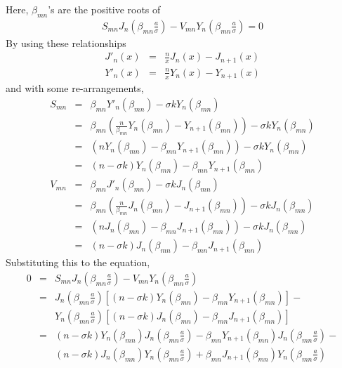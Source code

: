 \documentclass{article}
\begin{document}
Here, $\beta_{mn}$'s are the positive roots of
\begin{eqnarray}
    S_{mn} J_n\left(\beta_{mn}\frac{a}{\sigma}\right) -
    V_{mn} Y_n\left(\beta_{mn}\frac{a}{\sigma}\right) = 0
\end{eqnarray}
%
By using these relationships
%
\begin{eqnarray}
    J'_n(x) &=&  \frac{n}{x}J_n(x) - J_{n+1}(x) \\
    Y'_n(x) &=&  \frac{n}{x}Y_n(x) - Y_{n+1}(x)
\end{eqnarray}
%
and with some re-arrangements,
%
\begin{eqnarray}
    S_{mn} &=& \beta_{mn}Y'_n(\beta_{mn}) - \sigma kY_n(\beta_{mn}) \nonumber\\
           &=& \beta_{mn}\left(\frac{n}{\beta_{mn}}Y_n(\beta_{mn}) - Y_{n+1}(\beta_{mn})\right) - \sigma kY_n(\beta_{mn}) \nonumber\\
           &=& (nY_n(\beta_{mn}) - \beta_{mn}Y_{n+1}(\beta_{mn})) - \sigma kY_n(\beta_{mn}) \nonumber\\
           &=& (n - \sigma k)Y_n(\beta_{mn}) - \beta_{mn}Y_{n+1}(\beta_{mn}) \\
    V_{mn} &=& \beta_{mn}J'_n(\beta_{mn}) - \sigma kJ_n(\beta_{mn}) \nonumber\\
           &=& \beta_{mn}\left(\frac{n}{\beta_{mn}}J_n(\beta_{mn}) - J_{n+1}(\beta_{mn})\right) - \sigma kJ_n(\beta_{mn}) \nonumber\\
           &=& (nJ_n(\beta_{mn}) - \beta_{mn}J_{n+1}(\beta_{mn})) - \sigma kJ_n(\beta_{mn}) \nonumber\\
           &=& (n - \sigma k)J_n(\beta_{mn}) - \beta_{mn}J_{n+1}(\beta_{mn})
\end{eqnarray}
%
Substituting this to the equation,
%
\begin{eqnarray}
    0 &=& S_{mn} J_n\left(\beta_{mn}\frac{a}{\sigma}\right) -
          V_{mn} Y_n\left(\beta_{mn}\frac{a}{\sigma}\right) \nonumber\\
      &=& J_n\left(\beta_{mn}\frac{a}{\sigma}\right)
             \left[(n - \sigma k)Y_n(\beta_{mn}) - \beta_{mn}Y_{n+1}(\beta_{mn})\right] - \nonumber\\
      & & Y_n\left(\beta_{mn}\frac{a}{\sigma}\right)
             \left[(n - \sigma k)J_n(\beta_{mn}) - \beta_{mn}J_{n+1}(\beta_{mn})\right] \nonumber\\
      &=& (n - \sigma k)Y_n(\beta_{mn})J_n\left(\beta_{mn}\frac{a}{\sigma}\right) -
          \beta_{mn}Y_{n+1}(\beta_{mn})J_n\left(\beta_{mn}\frac{a}{\sigma}\right) -\nonumber\\
      & & (n - \sigma k)J_n(\beta_{mn})Y_n\left(\beta_{mn}\frac{a}{\sigma}\right) +
          \beta_{mn}J_{n+1}(\beta_{mn})Y_n\left(\beta_{mn}\frac{a}{\sigma}\right) \nonumber
\end{eqnarray}
\end{document}
